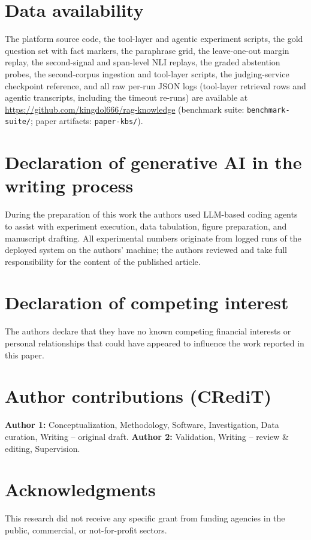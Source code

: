 \documentclass[preprint,12pt]{elsarticle}
\begin{document}
\section*{Data availability}
The platform source code, the tool-layer and agentic experiment scripts,
the gold question set with fact markers, the paraphrase grid, the
leave-one-out margin replay, the second-signal and span-level NLI
replays, the graded abstention probes, the second-corpus ingestion and
tool-layer scripts, the judging-service checkpoint
reference, and all raw per-run JSON logs (tool-layer retrieval rows and
agentic transcripts, including the timeout re-runs) are available at
\url{https://github.com/kingdol666/rag-knowledge} (benchmark suite:
\texttt{benchmark-suite/}; paper artifacts: \texttt{paper-kbs/}).

\section*{Declaration of generative AI in the writing process}
During the preparation of this work the authors used LLM-based coding
agents to assist with experiment execution, data tabulation, figure
preparation, and manuscript drafting. All experimental numbers originate
from logged runs of the deployed system on the authors' machine; the
authors reviewed and take full responsibility for the content of the
published article.

\section*{Declaration of competing interest}
The authors declare that they have no known competing financial interests
or personal relationships that could have appeared to influence the work
reported in this paper.

\section*{Author contributions (CRediT)}
\textbf{Author 1:} Conceptualization, Methodology, Software, Investigation,
Data curation, Writing -- original draft. \textbf{Author 2:} Validation,
Writing -- review \& editing, Supervision. %

\section*{Acknowledgments}
This research did not receive any specific grant from funding agencies in
the public, commercial, or not-for-profit sectors. %
\end{document}
